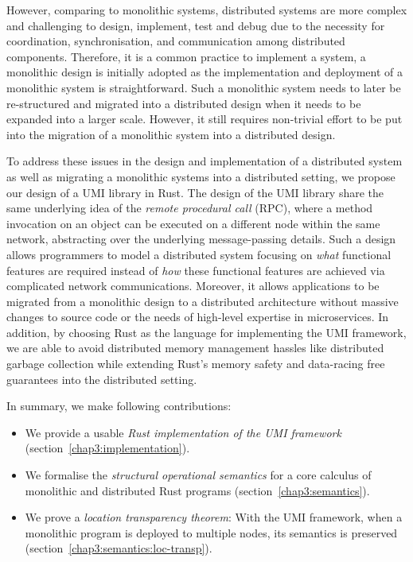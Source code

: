 However, comparing to monolithic systems, distributed systems are more complex and challenging to design, implement, test and debug due to the necessity for coordination, synchronisation, and communication among distributed components. Therefore, it is a common practice to implement a system, a monolithic design is initially adopted as the implementation and deployment of a monolithic system is straightforward. Such a monolithic system needs to later be re-structured and migrated into a distributed design when it needs to be expanded into a larger scale. However, it still requires non-trivial effort to be put into the migration of a monolithic system into a distributed design.

To address these issues in the design and implementation of a distributed system as well as migrating a monolithic systems into a distributed setting, we propose our design of a UMI library in Rust. The design of the UMI library share the same underlying idea of the \emph{remote procedural call} (RPC), where a method invocation on an object can be executed on a different node within the same network, abstracting over the underlying message-passing details. Such a design allows programmers to model a distributed system focusing on \emph{what} functional features are required instead of \emph{how} these functional features are achieved via complicated network communications. Moreover, it allows applications to be migrated from a monolithic design to a distributed architecture without massive changes to source code or the needs of high-level expertise in microservices. In addition, by choosing Rust as the language for implementing the UMI framework, we are able to avoid distributed memory management hassles like distributed garbage collection while extending Rust's memory safety and data-racing free guarantees into the distributed setting.

In summary, we make following contributions:
\begin{itemize}
    \item We provide a usable \emph{Rust implementation of the UMI framework} (section~\ref{chap3:implementation}).
    \item We formalise the \emph{structural operational semantics} for a core calculus of monolithic and distributed Rust programs (section~\ref{chap3:semantics}).
    \item We prove a \emph{location transparency theorem}: With the UMI framework, when a monolithic program is deployed to multiple nodes, its semantics is preserved (section~\ref{chap3:semantics:loc-transp}).
\end{itemize}

